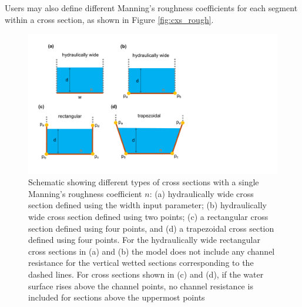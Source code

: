 \documentclass[fleqn]{article}
\begin{document}
Users may also define different Manning's roughness coefficients for each segment within a cross section, as shown in Figure \ref{fig:cxs_rough}.

\begin{figure}[h!tbp]
	\centering
	\includegraphics[scale=0.5]{figures/cxs.pdf}
	\caption[Schematic showing different types of channel cross sections with constant roughness.]{Schematic showing different types of cross sections with a single Manning's roughness coefficient $n$: (a) hydraulically wide cross section defined using the width input parameter; (b) hydraulically wide cross section defined using two points; (c) a rectangular cross section defined using four points, and (d) a trapezoidal cross section defined using four points.  For the hydraulically wide rectangular cross sections in (a) and (b) the model does not include any channel resistance for the vertical wetted sections corresponding to the dashed lines.  For cross sections shown in (c) and (d), if the water surface rises above the channel points, no channel resistance is included for sections above the uppermost points}
	\label{fig:cxs}
\end{figure}
\end{document}

